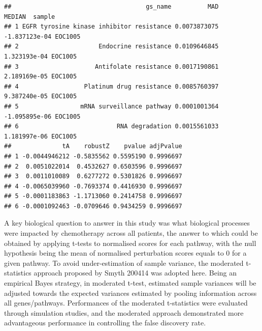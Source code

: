 \documentclass[9pt,a4paper,]{extarticle}
\begin{document}
\begin{verbatim}
##                                     gs_name          MAD        MEDIAN  sample
## 1 EGFR tyrosine kinase inhibitor resistance 0.0073873075 -1.837123e-04 EOC1005
## 2                      Endocrine resistance 0.0109646845  1.323193e-04 EOC1005
## 3                     Antifolate resistance 0.0017190861  2.189169e-05 EOC1005
## 4                  Platinum drug resistance 0.0085760397  9.387240e-05 EOC1005
## 5                 mRNA surveillance pathway 0.0001001364 -1.095895e-06 EOC1005
## 6                           RNA degradation 0.0015561033  1.181997e-06 EOC1005
##              tA    robustZ    pvalue adjPvalue
## 1 -0.0044946212 -0.5835562 0.5595190 0.9996697
## 2  0.0051022014  0.4532627 0.6503596 0.9996697
## 3  0.0011010089  0.6277272 0.5301826 0.9996697
## 4 -0.0065039960 -0.7693374 0.4416930 0.9996697
## 5 -0.0001183863 -1.1713060 0.2414758 0.9996697
## 6 -0.0001092463 -0.0709646 0.9434259 0.9996697
\end{verbatim}

A key biological question to answer in this study was what biological processes were impacted by chemotherapy across all patients, the answer to which could be obtained by applying t-tests to normalised scores for each pathway, with the null hypothesis being the mean of normalised perturbation scores equals to 0 for a given pathway. To avoid under-estimation of sample variance, the moderated t-statistics approach proposed by Smyth 200414 was adopted here. Being an empirical Bayes strategy, in moderated t-test, estimated sample variances will be adjusted towards the expected variances estimated by pooling information across all genes/pathways. Performances of the moderated t-statistics were evaluated through simulation studies, and the moderated approach demonstrated more advantageous performance in controlling the false discovery rate.
\end{document}
